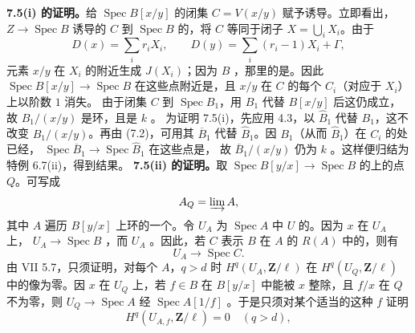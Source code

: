 \textbf{7.5(i) 的证明。}给 $\operatorname{Spec}B[x/y]$ 的闭集 $C=V(x/y)$ 赋予诱导。立即看出，$Z\to\operatorname{Spec}B$ 诱导的 $C$ 到 $\operatorname{Spec}B$ 的，将 $C$ 等同于闭子 $X=\bigcup_iX_i$。由于
\[D(x)=\sum_i r_iX_i,\qquad D(y)=\sum_i(r_i-1)X_i+\Gamma,\]
元素 $x/y$ 在 $X_i$ 的附近生成 $J(X_i)$；因为 $B$ ，那里的是。因此 $\operatorname{Spec}B[x/y]\to\operatorname{Spec}B$ 在这些点附近是，且 $x/y$ 在 $C$ 的每个 $C_i$（对应于 $X_i$）上以阶数 $1$ 消失。
由于闭集 $C$ 到 $\operatorname{Spec}B_1$，用 $B_1$ 代替 $B[x/y]$ 后这仍成立，故 $B_1/(x/y)$ 是环，且是 $k$ 。
为证明 7.5(i)，先应用 4.3，以 $\widehat B_1$ 代替 $B_1$，这不改变 $B_1/(x/y)$。再由 (7.2)，可用其 $\overline B_1$ 代替 $\widehat B_1$。因 $B_1$（从而 $\widehat B_1$）在 $C_i$ 的处已经， $\operatorname{Spec}\overline B_1\to\operatorname{Spec}\widehat B_1$ 在这些点是，
故 $\overline B_1/(x/y)$ 仍为 $k$ 。这样便归结为特例 6.7(ii)，得到结果。
\textbf{7.5(ii) 的证明。}取 $\operatorname{Spec}B[y/x]\to\operatorname{Spec}B$ 的上的点 $Q$。可写成
\[A_Q=\varinjlim A,\]
其中 $A$ 遍历 $B[y/x]$ 上环的一个。令 $U_A$ 为 $\operatorname{Spec}A$ 中 $U$ 的。因为 $x$ 在 $U_A$ 上， $U_A\to\operatorname{Spec}B$ ，而 $U_A$ 。因此，若 $C$ 表示 $B$ 在 $A$ 的 $R(A)$ 中的，则有
\[U_A\longrightarrow\operatorname{Spec}C.\]
由 VII 5.7，只须证明，对每个 $A$，$q>d$ 时 $H^q(U_A,\mathbf Z/\ell)$ 在 $H^q(U_Q,\mathbf Z/\ell)$ 中的像为零。因 $x$ 在 $U_Q$ 上，若 $f\in B$ 在 $B[y/x]$ 中能被 $x$ 整除，且 $f/x$ 在 $Q$ 不为零，则 $U_Q\to\operatorname{Spec}A$ 经 $\operatorname{Spec}A[1/f]$ 。于是只须对某个适当的这种 $f$ 证明
\[H^q(U_{A,f},\mathbf Z/\ell)=0\quad(q>d),\]
